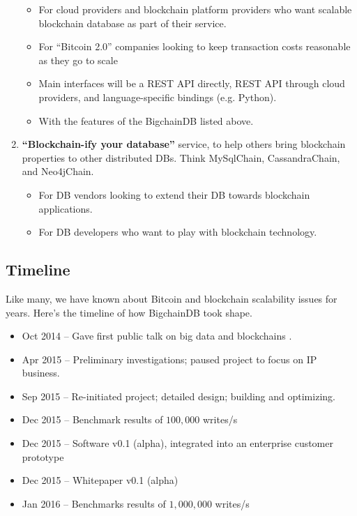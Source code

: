 \begin{enumerate}
\begin{itemize}
  \item For cloud providers and blockchain platform providers who want scalable blockchain database as part of their service.
  \item For “Bitcoin 2.0” companies looking to keep transaction costs reasonable as they go to scale
  \item Main interfaces will be a REST API directly, REST API through cloud providers, and language-specific bindings (e.g. Python).
  \item With the features of the BigchainDB listed above.
 \end{itemize}
 \item \textbf{“Blockchain-ify your database”} service, to help others bring blockchain properties to other distributed DBs. Think MySqlChain, CassandraChain, and Neo4jChain.
 \begin{itemize}
  \item For DB vendors looking to extend their DB towards blockchain applications.
  \item For DB developers who want to play with blockchain technology.
 \end{itemize}
\end{enumerate}


\subsection{Timeline}
Like many, we have known about Bitcoin and blockchain scalability issues for years.
Here’s the timeline of how BigchainDB took shape.
\begin{itemize}
  \item Oct 2014 – Gave first public talk on big data and blockchains \cite{mcconaghy2014blockchain}.
  \item Apr 2015 – Preliminary investigations; paused project to focus on IP business.
  \item Sep 2015 – Re-initiated project; detailed design; building and optimizing.
  \item Dec 2015 – Benchmark results of $100,000$ writes/s
  \item Dec 2015 – Software v0.1 (alpha), integrated into an enterprise customer prototype
  \item Dec 2015 – Whitepaper v0.1 (alpha)
  \item Jan 2016 – Benchmarks results of $1,000,000$ writes/s
\end{itemize}

